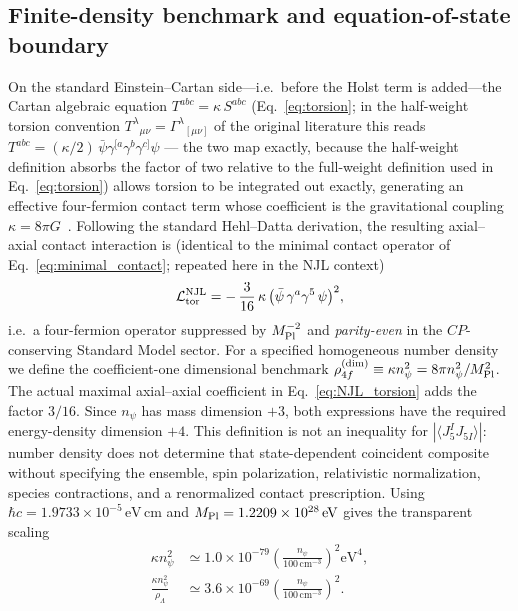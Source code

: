 \documentclass[aps,prd,twocolumn,superscriptaddress,preprintnumbers,nofootinbib,longbibliography,floatfix]{revtex4-2}
\begin{document}
\subsection{Finite-density benchmark and equation-of-state boundary}
\label{sec:r1_njl}
On the standard Einstein--Cartan side---i.e.\ before the Holst term is
added---the Cartan algebraic equation $T^{abc} = \kappa\,S^{abc}$
(Eq.~\eqref{eq:torsion}; in the half-weight torsion convention
$T^\lambda{}_{\mu\nu} = \Gamma^\lambda{}_{[\mu\nu]}$ of the original
literature this reads $T^{abc} = (\kappa/2)\,
\bar\psi \gamma^{[a}\gamma^b\gamma^{c]} \psi$ --- the two map exactly,
because the half-weight definition absorbs the factor of two relative to the
full-weight definition used in Eq.~\eqref{eq:torsion}) allows torsion to
be integrated out exactly, generating an effective four-fermion
contact term whose coefficient is the gravitational coupling
$\kappa = 8\pi G$~\cite{Hehl1976,HehlDattaNJL1971}. Following the standard
Hehl--Datta derivation, the resulting axial--axial contact interaction is
(identical to the minimal contact operator of Eq.~\ref{eq:minimal_contact};
repeated here in the NJL context)
\begin{equation}
\mathcal{L}^{\rm NJL}_{\rm tor}
= -\,\frac{3}{16}\,\kappa\,\bigl(\bar\psi\,\gamma^a\gamma^5\,\psi\bigr)^2,
\label{eq:NJL_torsion}
\end{equation}
i.e.\ a four-fermion operator suppressed by $M_{\rm Pl}^{-2}$ and
\emph{parity-even} in the $C\!P$-conserving Standard Model sector. For a
specified homogeneous number density we define the coefficient-one
dimensional benchmark
$\rho_{4f}^{(\mathrm{dim})}\equiv\kappa n_\psi^2
=8\pi n_\psi^2/M_{\rm Pl}^2$.
The actual maximal axial--axial coefficient in Eq.~\eqref{eq:NJL_torsion}
adds the factor $3/16$.  Since $n_\psi$ has mass dimension $+3$, both
expressions have the required energy-density dimension $+4$.
This definition is not an inequality for
$|\langle J_5^I J_{5I}\rangle|$: number density does not determine that
state-dependent coincident composite without specifying the ensemble, spin
polarization, relativistic normalization, species contractions, and a
renormalized contact prescription.
Using $\hbar c=1.9733\times10^{-5}\,\text{eV}\,\text{cm}$ and
$M_{\rm Pl}=1.2209\times10^{28}\,\text{eV}$ gives the transparent scaling
\begin{align}
\kappa n_\psi^2 &\simeq 1.0\times10^{-79}
\left(\frac{n_\psi}{100\,\mathrm{cm}^{-3}}\right)^2\!\mathrm{eV}^4,
\nonumber\\
\frac{\kappa n_\psi^2}{\rho_\Lambda}&\simeq3.6\times10^{-69}
\left(\frac{n_\psi}{100\,\mathrm{cm}^{-3}}\right)^2.
\end{align}
\end{document}
